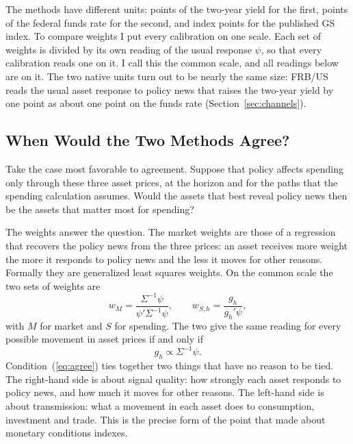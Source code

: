 \documentclass[11pt]{article}
\begin{document}
The methods have different units: points of the two-year yield for the first, points of the federal funds rate for the second, and index points for the published GS index. To compare weights I put every calibration on one scale. Each set of weights is divided by its own reading of the usual response $\psi$, so that every calibration reads one on it. I call this the common scale, and all readings below are on it. The two native units turn out to be nearly the same size: FRB/US reads the usual asset response to policy news that raises the two-year yield by one point as about one point on the funds rate (Section~\ref{sec:channels}).

\subsection{When Would the Two Methods Agree?}\label{sec:why}
Take the case most favorable to agreement. Suppose that policy affects spending only through these three asset prices, at the horizon and for the paths that the spending calculation assumes. Would the assets that best reveal policy news then be the assets that matter most for spending?

The weights answer the question. The market weights are those of a regression that recovers the policy news from the three prices: an asset receives more weight the more it responds to policy news and the less it moves for other reasons. Formally they are generalized least squares weights. On the common scale the two sets of weights are
\begin{equation}\label{eq:weights}
w_M=\frac{\Sigma^{-1}\psi}{\psi'\Sigma^{-1}\psi},
\qquad
w_{S,h}=\frac{g_h}{g_h'\psi},
\end{equation}
with $M$ for market and $S$ for spending. The two give the same reading for every possible movement in asset prices if and only if
\begin{equation}\label{eq:agree}
g_h\propto\Sigma^{-1}\psi .
\end{equation}
Condition~(\ref{eq:agree}) ties together two things that have no reason to be tied. The right-hand side is about signal quality: how strongly each asset responds to policy news, and how much it moves for other reasons. The left-hand side is about transmission: what a movement in each asset does to consumption, investment and trade. This is the precise form of the point that \citet{eika1996} made about monetary conditions indexes.
\end{document}
